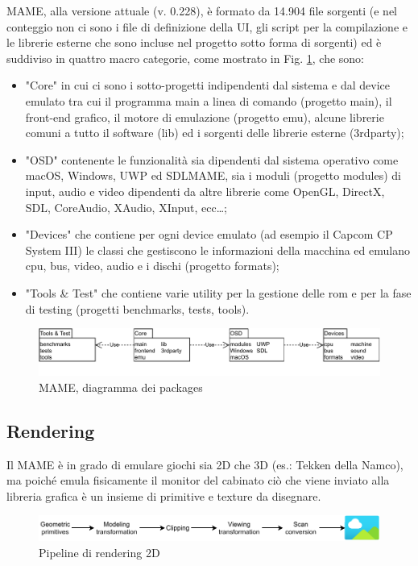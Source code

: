 MAME, alla versione attuale (v. 0.228), è formato da 14.904 file sorgenti (e nel conteggio non ci sono i file di definizione della UI, gli script per la compilazione e le librerie esterne che sono incluse nel progetto sotto forma di sorgenti) ed è suddiviso in quattro macro categorie, come mostrato in Fig. \ref{fig:mame_arch}, che sono:
\begin{itemize}
	\item "Core" in cui ci sono i sotto-progetti indipendenti dal sistema e dal device emulato tra cui il programma main a linea di comando (progetto main), il front-end grafico, il motore di emulazione (progetto emu), alcune librerie comuni a tutto il software (lib) ed i sorgenti delle librerie esterne (3rdparty);
	\item "OSD" contenente le funzionalità sia dipendenti dal sistema operativo come macOS, Windows, UWP ed SDLMAME, sia i moduli (progetto modules) di input, audio e video dipendenti da altre librerie come OpenGL, DirectX, SDL, CoreAudio, XAudio, XInput, ecc\dots;
	\item "Devices" che contiene per ogni device emulato (ad esempio il Capcom CP System III) le classi che gestiscono le informazioni della macchina ed emulano cpu, bus, video, audio e i dischi (progetto formats);
	\item "Tools \& Test" che contiene varie utility per la gestione delle rom e per la fase di testing (progetti benchmarks, tests, tools).
\end{itemize}

\begin{figure}[H]
	\includegraphics[width=\linewidth]{immagini/mame_arch}
	\caption{MAME, diagramma dei packages}
	\label{fig:mame_arch}
\end{figure}

\subsection{Rendering}
Il MAME è in grado di emulare giochi sia 2D che 3D (es.: Tekken della Namco), ma poiché emula fisicamente il monitor del cabinato ciò che viene inviato alla libreria grafica è un insieme di primitive e texture da disegnare.

\begin{figure}[H]
	\includegraphics[width=\linewidth]{immagini/rendering_pipeline}
	\caption{Pipeline di rendering 2D}
	\label{fig:rendering_pipeline}
\end{figure}

